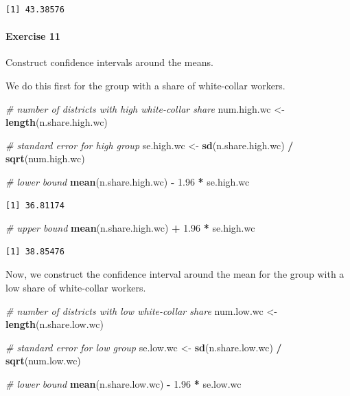 \documentclass[]{article}
\newenvironment{Shaded}{\begin{snugshade}}{\end{snugshade}}
\newcommand{\KeywordTok}[1]{\textcolor[rgb]{0.13,0.29,0.53}{\textbf{#1}}}
\newcommand{\FloatTok}[1]{\textcolor[rgb]{0.00,0.00,0.81}{#1}}
\newcommand{\StringTok}[1]{\textcolor[rgb]{0.31,0.60,0.02}{#1}}
\newcommand{\CommentTok}[1]{\textcolor[rgb]{0.56,0.35,0.01}{\textit{#1}}}
\newcommand{\OperatorTok}[1]{\textcolor[rgb]{0.81,0.36,0.00}{\textbf{#1}}}
\newcommand{\NormalTok}[1]{#1}
\let\oldparagraph\paragraph
\renewcommand{\paragraph}[1]{\oldparagraph{#1}\mbox{}}
\theoremstyle{definition}
\theoremstyle{definition}
\theoremstyle{definition}
\theoremstyle{remark}
\begin{document}
\begin{verbatim}
[1] 43.38576
\end{verbatim}

\paragraph{Exercise 11}\label{exercise-11-2}

Construct confidence intervals around the means.

We do this first for the group with a share of white-collar workers.

\begin{Shaded}
\begin{Highlighting}[]
\CommentTok{# number of districts with high white-collar share}
\NormalTok{num.high.wc <-}\StringTok{ }\KeywordTok{length}\NormalTok{(n.share.high.wc)}

\CommentTok{# standard error for high group}
\NormalTok{se.high.wc <-}\StringTok{ }\KeywordTok{sd}\NormalTok{(n.share.high.wc) }\OperatorTok{/}\StringTok{ }\KeywordTok{sqrt}\NormalTok{(num.high.wc)}

\CommentTok{# lower bound}
\KeywordTok{mean}\NormalTok{(n.share.high.wc) }\OperatorTok{-}\StringTok{ }\FloatTok{1.96} \OperatorTok{*}\StringTok{ }\NormalTok{se.high.wc}
\end{Highlighting}
\end{Shaded}

\begin{verbatim}
[1] 36.81174
\end{verbatim}

\begin{Shaded}
\begin{Highlighting}[]
\CommentTok{# upper bound}
\KeywordTok{mean}\NormalTok{(n.share.high.wc) }\OperatorTok{+}\StringTok{ }\FloatTok{1.96} \OperatorTok{*}\StringTok{ }\NormalTok{se.high.wc}
\end{Highlighting}
\end{Shaded}

\begin{verbatim}
[1] 38.85476
\end{verbatim}

Now, we construct the confidence interval around the mean for the group
with a low share of white-collar workers.

\begin{Shaded}
\begin{Highlighting}[]
\CommentTok{# number of districts with low white-collar share}
\NormalTok{num.low.wc <-}\StringTok{ }\KeywordTok{length}\NormalTok{(n.share.low.wc)}

\CommentTok{# standard error for low group}
\NormalTok{se.low.wc <-}\StringTok{ }\KeywordTok{sd}\NormalTok{(n.share.low.wc) }\OperatorTok{/}\StringTok{ }\KeywordTok{sqrt}\NormalTok{(num.low.wc)}

\CommentTok{# lower bound}
\KeywordTok{mean}\NormalTok{(n.share.low.wc) }\OperatorTok{-}\StringTok{ }\FloatTok{1.96} \OperatorTok{*}\StringTok{ }\NormalTok{se.low.wc}
\end{Highlighting}
\end{Shaded}
\end{document}
